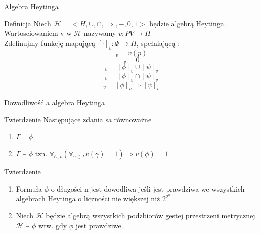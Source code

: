 \documentclass{beamer}
\begin{document}
\begin{frame}{Algebra Heytinga}
 \begin{block}{Definicja}
 Niech \( \mathcal{H} = < H, \cup, \cap, \Rightarrow, - , 0 ,1 >  \) będzie algebrą Heytinga.\\
  Wartosciowaniem v w \( \mathcal{H} \) nazywamy \( v : PV \rightarrow H\)\\
 Zdefinujmy funkcję mapującą  \( [ \cdot ]_v : \Phi \rightarrow H\), spełniającą :
 \begin{equation*}
 	[p]_v = v ( p)
 \end{equation*} 
 \begin{equation*}
 	[\bot]_v = 0
 \end{equation*} 
  \begin{equation*}
 	[\phi \vee \psi]_v = [\phi]_v \cup [\psi]_v
 \end{equation*}
  \begin{equation*}
 	[\phi \wedge \psi]_v = [\phi]_v \cap [\psi]_v 
 \end{equation*}
  \begin{equation*}
 	[\phi \rightarrow \psi]_v = [\phi]_v \Rightarrow [\psi]_v
 \end{equation*}
 \end{block}
\end{frame}

\begin{frame}{Dowodliwość a algebra Heytinga}
 \begin{block}{Twierdzenie}
Następujące zdania sa równoważne
	\begin{enumerate}
	\item \(\Gamma \vdash \phi\)
 	\item \(\Gamma \models \phi\) tzn. \( \forall_{\mathcal{C}, v} ( \forall_{\gamma \in \Gamma} v(\gamma) = 1 ) \Rightarrow v(\phi)  = 1\)

	\end{enumerate}
 \end{block}
 
 \begin{block}{Twierdzenie}
	\begin{enumerate}
	\item Formuła \(\phi\) o długości n jest dowodliwa jeśli jest prawdziwa we wszystkich algebrach Heytinga o liczności nie większej niż \( 2 ^ {2 ^ n}\)
 	\item Niech \(\mathcal{H}\) będzie algebrą wszystkich podzbiorów gestej przestrzeni metrycznej. \( \mathcal{H} \models \phi\) wtw. gdy \(\phi\) jest prawdziwe.

	\end{enumerate}
 \end{block}
\end{frame}
\end{document}
